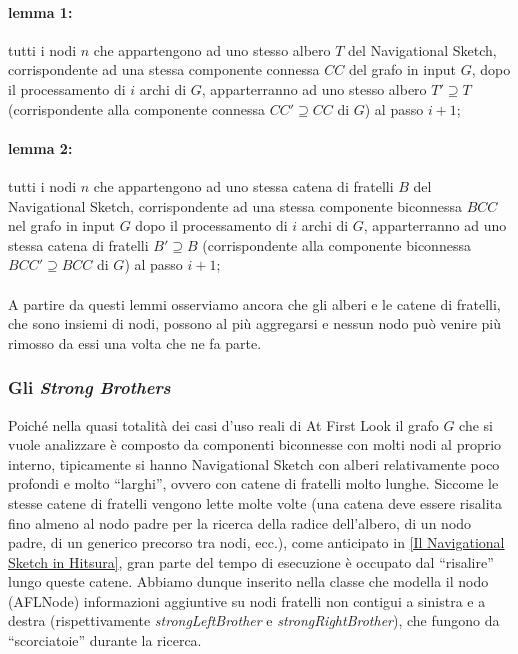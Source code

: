 \documentclass[a4paper,11pt]{report}
\begin{document}
 \paragraph{lemma 1:}tutti i nodi $n$ che appartengono ad uno stesso albero $T$ del Navigational Sketch, corrispondente ad una stessa
componente connessa $CC$ del grafo in input $G$, 
dopo il processamento di $i$ archi di $G$, apparterranno ad uno stesso albero $T'\supseteq T$ (corrispondente alla componente connessa
$CC'\supseteq CC$ di $G$) al passo $i+1$;
 \paragraph{lemma 2:}tutti i nodi $n$ che appartengono ad uno stessa catena di fratelli $B$ del Navigational Sketch, corrispondente ad una
stessa componente biconnessa $BCC$ nel
 grafo in input $G$ 
dopo il processamento di $i$ archi di $G$, apparterranno ad uno stessa catena di fratelli $B'\supseteq B$ (corrispondente alla componente
biconnessa $BCC'\supseteq BCC$ di $G$) 
al passo $i+1$;
\paragraph{}
A partire da questi lemmi osserviamo ancora che gli alberi e le catene di fratelli, che sono insiemi di nodi, possono al più aggregarsi e
nessun nodo può venire più rimosso da essi 
una volta che ne fa parte.
\subsubsection{Gli \emph{Strong Brothers}}
Poiché nella quasi totalità dei casi d'uso reali di At First Look il grafo $G$ che si vuole analizzare è composto da componenti biconnesse
con molti nodi al proprio interno, tipicamente 
si hanno Navigational Sketch con alberi relativamente poco profondi e molto ``larghi'', ovvero con catene di fratelli molto lunghe. Siccome
le stesse catene di fratelli vengono
lette molte volte (una catena deve essere risalita fino almeno al nodo padre per la ricerca della radice dell'albero, di un nodo padre, di
un generico precorso tra nodi,
ecc.), come anticipato in \ref{Il Navigational Sketch in Hitsura}, gran parte del tempo di esecuzione è occupato dal ``risalire'' lungo
queste catene. Abbiamo dunque
 inserito nella classe che modella il nodo (AFLNode) informazioni aggiuntive su nodi 
fratelli non contigui a sinistra e a destra (rispettivamente \emph{strongLeftBrother} e \emph{strongRightBrother}), che fungono da
``scorciatoie'' durante la ricerca.
\end{document}

